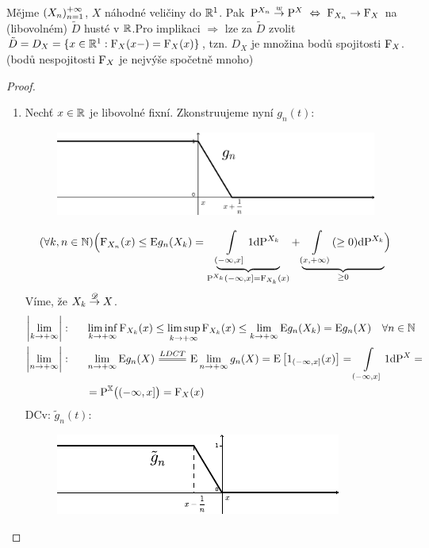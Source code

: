 \begin{theorem}
	Mějme $(X_n)_{n=1}^{+\infty}$, $X$ náhodné veličiny do $\mathbb{R}^1$. Pak $\mathrm{P}^{X_n}\stackrel{w}{\to} \mathrm{P}^X~\Leftrightarrow~\mathrm{F}_{X_n}\to \mathrm{F}_X$ na (libovolném) $\tilde{D}$ husté v $\mathbb{R}$.\newline Pro implikaci $\Rightarrow$ lze za $\tilde{D}$ zvolit $\tilde{D}=D_X=\{ x\in\mathbb{R}^1: \mathrm{F}_X(x-)=\mathrm{F}_X(x) \}$, tzn. $D_X$ je množina bodů spojitosti $\mathrm{F}_X$. (bodů nespojitosti $\mathrm{F}_X$ je nejvýše spočetně mnoho)
	\begin{proof}
		\begin{enumerate}[	$\Rightarrow$:]
			\item Nechť $x\in\mathbb{R}$ je libovolné fixní. Zkonstruujeme nyní $g_n(t)$:
			\begin{figure}[h]
				\centering
				\includegraphics[width=0.5\linewidth]{veta}
				\label{fig:veta}
			\end{figure}
			
			$$(\forall k,n\in\mathbb{N})\Bigl( \mathrm{F}_{X_n}(x)\leq \mathrm{E} g_n(X_k)=\underbrace{\int\limits_{(-\infty,x]}1\mathrm{d}\mathrm{P}^{X_k}}_{\mathrm{P}^{X_k}(-\infty,x]=\mathrm{F}_{X_k}(x)}+\underbrace{\int\limits_{(x,+\infty)}(\geq 0)\mathrm{d}\mathrm{P}^{X_k}}_{\geq 0} \Bigr)$$
			Víme, že $X_k\stackrel{\mathscr{D}}{\to} X$. 
			\[
			\begin{split}
			\left| \lim\limits_{ k\to +\infty} \right|:~~~~~&\liminf\limits_{ k\to +\infty} \FF_{X_k}(x)\leq \limsup\limits_{ k\to +\infty} \FF_{X_k}(x)\leq \lim\limits_{ k\to +\infty} \E g_n(X_k)=\E g_n(X)~~~\forall n\in\N \\
			\left| \lim\limits_{ n\to +\infty} \right|:~~~~~& \lim\limits_{ n\to +\infty} \E g_n(X)\equal{LDCT}\E \lim\limits_{ n\to +\infty} g_n(X)=\E \left[ 1_{(-\infty,x]}(x) \right]=\int\limits_{(-\infty,x]}1\dif\PP^X=\\
			&=\PEX\bigl( (-\infty,x] \bigr)=\FF_X(x)
			\end{split}
			\] 
			DCv: $\tilde{g}_n(t)$:
			\begin{figure}[h]
				\centering
				\includegraphics[width=0.5\linewidth]{veta2}
				\label{fig:veta2}
			\end{figure}
			

\end{enumerate}
\end{proof}
\end{theorem}
